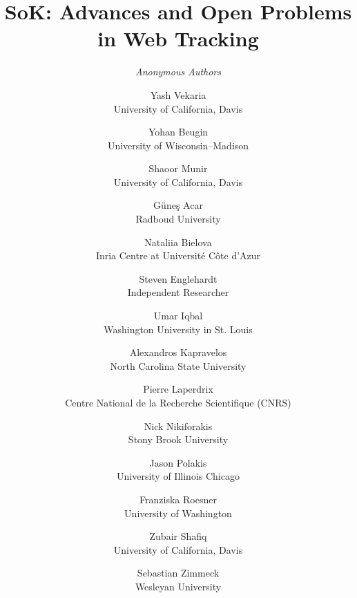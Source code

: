 \documentclass[letterpaper,twocolumn,10pt]{article}
\begin{document}

\date{}

\title{\Large \bf SoK: Advances and Open Problems in Web Tracking}

\ifanonymous
\author{\em Anonymous Authors}
\else
\author{
{\rm Yash Vekaria}\\
University of California, Davis
\and
{\rm Yohan Beugin}\\
University of Wisconsin–Madison
\and
{\rm Shaoor Munir}\\
University of California, Davis
\and
{\rm Güneş Acar}\\
Radboud University
\and
{\rm Nataliia Bielova}\\
Inria Centre at Université Côte d’Azur
\and
{\rm Steven Englehardt}\\
Independent Researcher
\and
{\rm Umar Iqbal}\\
Washington University in St. Louis
\and
{\rm Alexandros Kapravelos}\\
North Carolina State University
\and
{\rm Pierre Laperdrix}\\
Centre National de la Recherche Scientifique (CNRS)
\and
{\rm Nick Nikiforakis}\\
Stony Brook University
\and
{\rm Jason Polakis}\\
University of Illinois Chicago
\and
{\rm Franziska Roesner}\\
University of Washington
\and
{\rm Zubair Shafiq}\\
University of California, Davis
\and
{\rm Sebastian Zimmeck}\\
Wesleyan University
} %
\fi

\maketitle

\begin{abstract}

\end{abstract}









\end{document}
